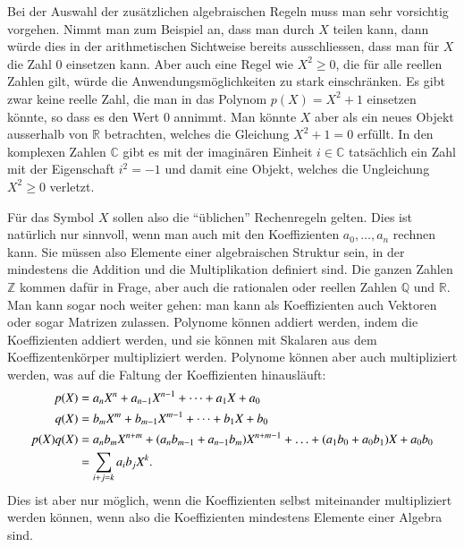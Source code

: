 Bei der Auswahl der zusätzlichen algebraischen Regeln muss man sehr
vorsichtig vorgehen.
Nimmt man zum Beispiel an, dass man durch $X$ teilen kann, dann würde
dies in der arithmetischen Sichtweise bereits ausschliessen, dass man
für $X$ die Zahl $0$ einsetzen kann.
Aber auch eine Regel wie $X^2 \ge 0$, die für alle reellen Zahlen gilt,
würde die Anwendungsmöglichkeiten zu stark einschränken.
Es gibt zwar keine reelle Zahl, die man in das Polynom $p(X)=X^2+1$
einsetzen könnte, so dass es den Wert $0$ annimmt.
Man könnte $X$ aber als ein neues Objekt ausserhalb von $\mathbb{R}$
betrachten, welches die Gleichung $X^2+1=0$ erfüllt.
In den komplexen Zahlen $\mathbb{C}$ gibt es mit der imaginären
Einheit $i\in\mathbb{C}$ tatsächlich ein Zahl mit der Eigenschaft
$i^2=-1$ und damit eine Objekt, welches die Ungleichung $X^2\ge 0$
verletzt.

Für das Symbol $X$ sollen also die ``üblichen'' Rechenregeln gelten.
Dies ist natürlich nur sinnvoll, wenn man auch mit den Koeffizienten
$a_0,\dots,a_n$ rechnen kann.
Sie müssen also Elemente einer
algebraischen Struktur sein, in der mindestens die Addition und die
Multiplikation definiert sind.
Die ganzen Zahlen $\mathbb{Z}$ kommen dafür in Frage, aber auch
die rationalen oder reellen Zahlen $\mathbb{Q}$ und $\mathbb{R}$.
Man kann sogar noch weiter gehen: man kann als Koeffizienten auch
Vektoren oder sogar Matrizen zulassen.
Polynome können addiert werden, indem die Koeffizienten addiert werden,
und sie können mit Skalaren aus dem Koeffizentenkörper multipliziert werden.
Polynome können aber auch multipliziert werden, was auf die Faltung
der Koeffizienten hinausläuft:
\begin{align}
p(X) &= a_nX^n + a_{n-1}X^{n-1} + \dots + a_1X + a_0
\notag
\\
q(X) &= b_mX^m + b_{m-1}X^{m-1} + \dots + b_1X + b_0
\notag
\\
p(X) q(X) &=
a_{n}b_{m}X^{n+m}
+
(a_{n}b_{m-1}+a_{n-1}b_{m})X^{n+m-1}
+
\ldots
+
(a_1b_0+a_0b_1)X
+
a_0b_0
\\
&=
\sum_{i + j = k}a_ib_j X^k.
\label{buch:eqn:polynome:faltung}
\end{align}
Dies ist aber nur möglich, wenn die Koeffizienten selbst miteinander
multipliziert werden können, wenn also die Koeffizienten mindestens
Elemente einer Algebra sind.



%
%


